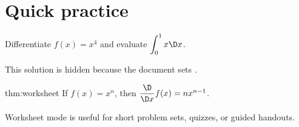 \documentclass[worksheet]{workbook}
\begin{document}
\maketitle

\section{Quick practice}
\begin{exercise}
Differentiate $f(x)=x^4$ and evaluate $\dint_0^1 x\dx$.
\myskip
\begin{solution}
This solution is hidden because the document sets \texttt{\string\solutionfalse}.
\end{solution}
\end{exercise}

\begin{theo}{thm:worksheet}
If $f(x)=x^n$, then $\ddx f(x)=nx^{n-1}$.
\end{theo}

\begin{note}[Reminder:]
Worksheet mode is useful for short problem sets, quizzes, or guided handouts.
\end{note}
\end{document}
